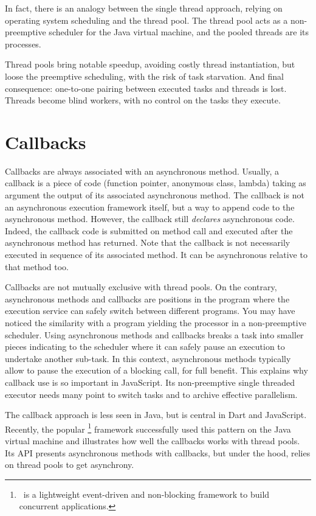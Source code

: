 In fact, there is an analogy between the single thread approach, relying on operating system scheduling and the thread pool. The thread pool acts as a non-preemptive scheduler for the Java virtual machine, and the pooled threads are its processes.

Thread pools bring notable speedup, avoiding costly thread instantiation, but loose the preemptive scheduling, with the risk of task starvation.
And final consequence: one-to-one pairing between executed tasks and threads is lost. Threads become blind workers, with no control on the tasks they execute.

\section{Callbacks}

Callbacks are always associated with an asynchronous method. Usually, a callback is a piece of code (function pointer, anonymous class, lambda) taking as argument the output of its associated asynchronous method. The callback is not an asynchronous execution framework itself, but a way to append code to the asynchronous method. However, the callback still \emph{declares} asynchronous code. Indeed, the callback code is submitted on method call and executed after the asynchronous method has returned. Note that the callback is not necessarily executed in sequence of its associated method. It can be asynchronous relative to that method too.

Callbacks are not mutually exclusive with thread pools. On the contrary, asynchronous methods and callbacks are positions in the program where the execution service can safely switch between different programs. You may have noticed the similarity with a program yielding the processor in a non-preemptive scheduler. Using asynchronous methods and callbacks breaks a task into smaller pieces indicating to the scheduler where it can safely pause an execution to undertake another sub-task. In this context, asynchronous methods typically allow to pause the execution of a blocking call, for full benefit. This explains why callback use is so important in JavaScript. Its non-preemptive single threaded executor needs many point to switch tasks and to archive effective parallelism.

The callback approach is less seen in Java, but is central in Dart and JavaScript. Recently, the popular \vertx\footnote{\vertx\ is a lightweight event-driven and non-blocking framework to build concurrent applications.} framework successfully used this pattern on the Java virtual machine and illustrates how well the callbacks works with thread pools. Its API presents asynchronous methods with callbacks, but under the hood, relies on thread pools to get asynchrony.

